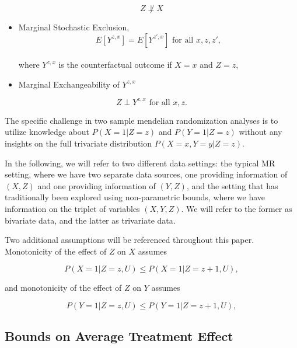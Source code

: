 \documentclass[
]{article}
\theoremstyle{plain}
\begin{document}
\begin{equation}
  Z \not\perp X \label{eq:z_cor_x}\tag{A2}
\end{equation}

\begin{itemize}
\item
  Marginal Stochastic Exclusion,\\
  \begin{equation}
  E[Y^{z,x}] = E[Y^{z',x}] \text{ for all } x,z,z', \label{eq:marg-stoch-excl}\tag{A3}
  \end{equation}\\
  where \(Y^{z,x}\) is the counterfactual outcome if \(X = x\) and \(Z = z\),
\item
  Marginal Exchangeability of \(Y^{z,x}\)
\end{itemize}

\begin{equation}
Z \perp Y^{z,x} \text{ for all } x,z. \label{eq:marg-exch}\tag{A4}
\end{equation}

The specific challenge in two sample mendelian randomization analyses is to utilize knowledge about \(P(X = 1 | Z = z)\) and \(P(Y = 1 | Z = z)\) without any insights on the full trivariate distribution \(P(X = x, Y = y | Z = z)\).

In the following, we will refer to two different data settings: the typical MR setting, where we have two separate data sources, one providing information of \((X,Z)\) and one providing information of \((Y,Z)\), and the setting that has traditionally been explored using non-parametric bounds, where we have information on the triplet of variables \((X,Y,Z)\). We will refer to the former as bivariate data, and the latter as trivariate data.

Two additional assumptions will be referenced throughout this paper. Monotonicity of the effect of \(Z\) on \(X\) assumes

\begin{equation}
P(X = 1 | Z = z, U) \le P(X = 1 | Z = z+1, U), \label{eq:x_monotone}
\end{equation}

and monotonicity of the effect of \(Z\) on \(Y\) assumes

\begin{equation}
P(Y = 1 | Z = z, U) \le P(Y = 1 | Z = z+1, U), \label{eq:y_monotone}
\end{equation}

\hypertarget{bounds-on-average-treatment-effect}{%
\subsection{Bounds on Average Treatment Effect}\label{bounds-on-average-treatment-effect}}
\end{document}

